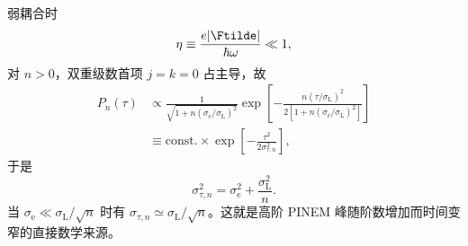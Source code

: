 弱耦合时
\begin{equation}
\eta\equiv \frac{e|\Ftilde|}{\hbar\omega}\ll1,
\end{equation}
对 \(n>0\)，双重级数首项 \(j=k=0\) 占主导，故
\begin{align}
P_n(\tau)
&\propto
\frac{1}{\sqrt{1+n(\sigma_{\mathrm e}/\sigma_{\mathrm L})^2}}
\exp\!\left[
-\frac{n(\tau/\sigma_{\mathrm L})^2}
{2[1+n(\sigma_{\mathrm e}/\sigma_{\mathrm L})^2]}
\right]\\
&\equiv \text{const.}\times
\exp\!\left[-\frac{\tau^2}{2\sigma_{\tau,n}^2}\right],
\end{align}
于是
\begin{equation}
\boxed{
\sigma_{\tau,n}^2=\sigma_{\mathrm e}^2+\frac{\sigma_{\mathrm L}^2}{n}.}
\label{eq:temporal_narrowing}
\end{equation}
当 \(\sigma_{\mathrm e}\ll\sigma_{\mathrm L}/\sqrt n\) 时有 \(\sigma_{\tau,n}\simeq\sigma_{\mathrm L}/\sqrt n\)。这就是高阶 PINEM 峰随阶数增加而时间变窄的直接数学来源。


